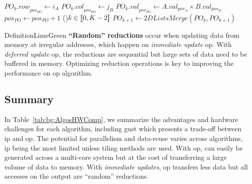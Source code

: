 \begin{algorithm}[htbp]
{{{                
                $\mathit{PO_k.row}_{pos_\mathit{PO}} \gets i_A$\;
                $\mathit{PO_k.col}_{pos_\mathit{PO}} \gets j_B$\;
                $\mathit{PO_k.val}_{pos_\mathit{PO}} \gets \mathit{A.val}_{pos_A} \times \mathit{B.val}_{pos_B}$\; 
                $pos_\mathit{PO} \gets pos_\mathit{PO} + 1$\;
            }
        }
    }
    \For(){$k \in [\![ 0, K-2 ]\!]$}{
        $\mathit{PO}_{k+1} \gets \mathit{2DListsMerge}(\mathit{PO}_k, \mathit{PO}_{k+1})$\;
    }
\end{algorithm}

\begin{highlight}{Definition}{LimeGreen}
    \textbf{``Random'' \glspl{reduction}} occur when updating data from memory at irregular addresses, which happen on \emph{immediate update} \acrshort{op}.
    With \emph{deferred update} \acrshort{op}, the \glspl{reduction} are sequential but large sets of data need to be buffered in memory.
    Optimizing \gls{reduction} operations is key to improving the performance on \acrshort{op} algorithm.
\end{highlight}

\subsection{Summary}
\label{sec:bg:AlgosHWComp}

In Table~\ref{tab:bg:AlgosHWComp}, we summarize the advantages and hardware challenges for each algorithm, including \acrshort{gust} which presents a trade-off between \acrshort{ip} and \acrshort{op}.
The potential for parallelism and data-reuse varies across algorithms, \acrshort{ip} being the most limited unless \gls{tiling} methods are used.
With \acrshort{op},  can easily be generated across a multi-core system but at the cost of transferring a large volume of data to memory.
With \emph{immediate updates}, \acrshort{op} transfers less data but all accesses on the output are ``random'' \glspl{reduction}.

